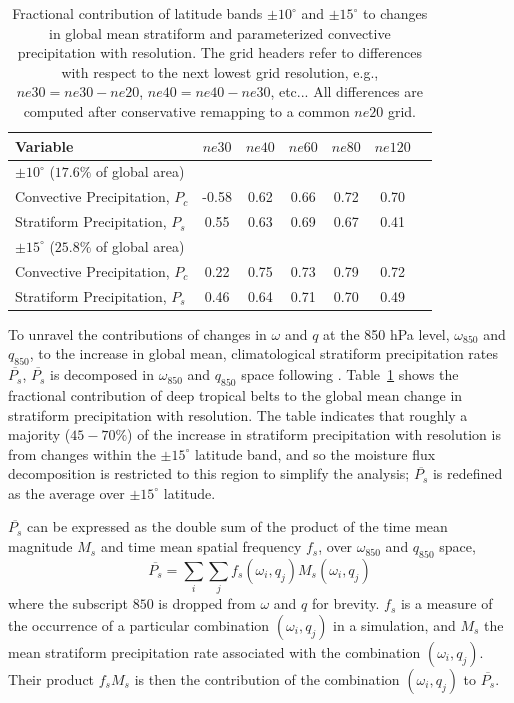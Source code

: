 \documentclass[times]{qjrms4}
\begin{document}
 \begin{table}
 \caption{Fractional contribution of latitude bands $\pm 10^{\circ}$ and $\pm 15^{\circ}$ to changes in global mean stratiform and parameterized convective precipitation with resolution. The grid headers refer to differences with respect to the next lowest grid resolution, e.g., $ne30 = ne30-ne20$, $ne40=ne40-ne30$, etc... All differences are computed after conservative remapping to a common $ne20$ grid.}
 \centering
 \scriptsize
 \begin{tabular}{lcccccc}
   \hline
   Variable & $ne30$ & $ne40$ & $ne60$ & $ne80$ & $ne120$ \\ 
   \hline
   $\pm 10^{\circ}$ ($17.6\%$ of global area) \\
   Convective Precipitation, $P_c$ & -0.58 & 0.62 & 0.66 & 0.72 & 0.70 \\
   Stratiform Precipitation, $P_s$ & 0.55 & 0.63 & 0.69 & 0.67 & 0.41 \\ 
   \hline
   $\pm 15^{\circ}$ ($25.8\%$ of global area) \\
   Convective Precipitation, $P_c$ & 0.22 & 0.75 & 0.73 & 0.79 & 0.72 \\
   Stratiform Precipitation, $P_s$ & 0.46 & 0.64 & 0.71 & 0.70 & 0.49 \\      
 \hline
 \end{tabular}
 \label{tbl:table2}
 \end{table}

To unravel the contributions of changes in $\omega$ and $q$ at the 850 hPa level, $\omega_{850}$ and $q_{850}$, to the increase in global mean, climatological stratiform precipitation rates $\overline{P_s}$, $\overline{P_s}$ is decomposed in $\omega_{850}$ and $q_{850}$ space following \cite{TETAL2018CD}. Table~\ref{tbl:table2} shows the fractional contribution of deep tropical belts to the global mean change in stratiform precipitation with resolution. The table indicates that roughly a majority ($45-70 \%$) of the increase in stratiform precipitation with resolution is from changes within the $\pm 15^{\circ}$ latitude band, and so the moisture flux decomposition is restricted to this region to simplify the analysis; $\overline{P_s}$ is redefined as the average over $\pm 15^{\circ}$ latitude. 

$\overline{P_s}$ can be expressed as the double sum of the product of the time mean magnitude $M_s$ and time mean spatial frequency $f_s$, over $\omega_{850}$ and $q_{850}$ space,
\begin{equation}
\overline{P_{s}} = \sum_i \sum_j f_s \left( \omega_i , q_j \right) M_s \left( \omega_i , q_j \right) \label{eq:pdecomp}
\end{equation}
where the subscript $850$ is dropped from $\omega$ and $q$ for brevity. $f_s$ is a measure of the occurrence of a particular combination $\left( \omega_i , q_j \right)$ in a simulation, and $M_s$ the mean stratiform precipitation rate associated with the combination $\left( \omega_i , q_j \right)$. Their product $f_s M_s$ is then the contribution of the combination $\left( \omega_i , q_j \right)$ to $\overline{P_s}$.
\end{document}
